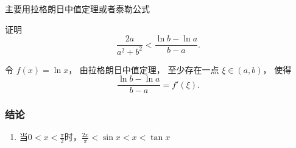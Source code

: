 \documentclass[../book.tex]{subfiles}
\begin{document}
    主要用拉格朗日中值定理或者泰勒公式

    \begin{analysisbox}[Example]
        证明
        \[
            \frac{2a}{a^2+b^2}
            <
            \frac{\ln b-\ln a}{\,b-a\,}.
        \]

        令 $f(x)=\ln x$，
        由拉格朗日中值定理，
        至少存在一点 $\xi\in(a,b)$，
        使得
        \[
            \frac{\ln b-\ln a}{b-a}
            = f'(\xi).
        \]
    \end{analysisbox}

    \subsubsection{结论}

    \begin{enumerate}
        \item 当$0 < x < \displaystyle\frac{\pi}{2}$时，$\displaystyle\frac{2x}{\pi} < \sin x < x < \tan x$
    \end{enumerate}
\end{document}
